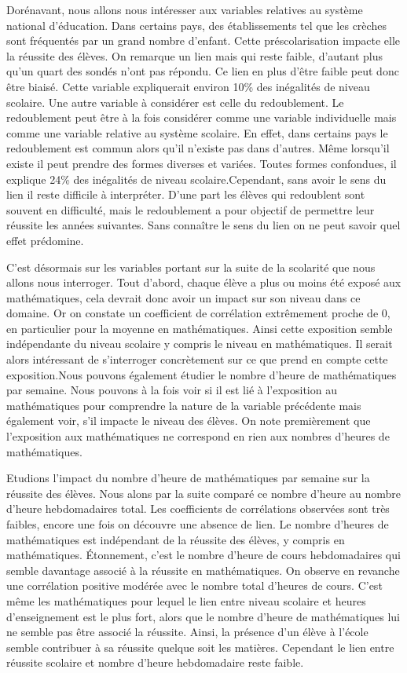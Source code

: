 \documentclass[
  french,
  11pt,
  a4paper,
]{report}
\begin{document}
Dorénavant, nous allons nous intéresser aux variables relatives au
système national d'éducation. Dans certains pays, des établissements tel
que les crèches sont fréquentés par un grand nombre d'enfant. Cette
préscolarisation impacte elle la réussite des élèves. On remarque un
lien mais qui reste faible, d'autant plus qu'un quart des sondés n'ont
pas répondu. Ce lien en plus d'être faible peut donc être biaisé. Cette
variable expliquerait environ 10\% des inégalités de niveau scolaire.
Une autre variable à considérer est celle du redoublement. Le
redoublement peut être à la fois considérer comme une variable
individuelle mais comme une variable relative au système scolaire. En
effet, dans certains pays le redoublement est commun alors qu'il
n'existe pas dans d'autres. Même lorsqu'il existe il peut prendre des
formes diverses et variées. Toutes formes confondues, il explique 24\%
des inégalités de niveau scolaire.Cependant, sans avoir le sens du lien
il reste difficile à interpréter. D'une part les élèves qui redoublent
sont souvent en difficulté, mais le redoublement a pour objectif de
permettre leur réussite les années suivantes. Sans connaître le sens du
lien on ne peut savoir quel effet prédomine.

C'est désormais sur les variables portant sur la suite de la scolarité
que nous allons nous interroger. Tout d'abord, chaque élève a plus ou
moins été exposé aux mathématiques, cela devrait donc avoir un impact
sur son niveau dans ce domaine. Or on constate un coefficient de
corrélation extrêmement proche de 0, en particulier pour la moyenne en
mathématiques. Ainsi cette exposition semble indépendante du niveau
scolaire y compris le niveau en mathématiques. Il serait alors
intéressant de s'interroger concrètement sur ce que prend en compte
cette exposition.Nous pouvons également étudier le nombre d'heure de
mathématiques par semaine. Nous pouvons à la fois voir si il est lié à
l'exposition au mathématiques pour comprendre la nature de la variable
précédente mais également voir, s'il impacte le niveau des élèves. On
note premièrement que l'exposition aux mathématiques ne correspond en
rien aux nombres d'heures de mathématiques.

Etudions l'impact du nombre d'heure de mathématiques par semaine sur la
réussite des élèves. Nous alons par la suite comparé ce nombre d'heure
au nombre d'heure hebdomadaires total. Les coefficients de corrélations
observées sont très faibles, encore une fois on découvre une absence de
lien. Le nombre d'heures de mathématiques est indépendant de la réussite
des élèves, y compris en mathématiques. Étonnement, c'est le nombre
d'heure de cours hebdomadaires qui semble davantage associé à la
réussite en mathématiques. On observe en revanche une corrélation
positive modérée avec le nombre total d'heures de cours. C'est même les
mathématiques pour lequel le lien entre niveau scolaire et heures
d'enseignement est le plus fort, alors que le nombre d'heure de
mathématiques lui ne semble pas être associé la réussite. Ainsi, la
présence d'un élève à l'école semble contribuer à sa réussite quelque
soit les matières. Cependant le lien entre réussite scolaire et nombre
d'heure hebdomadaire reste faible.
\end{document}
